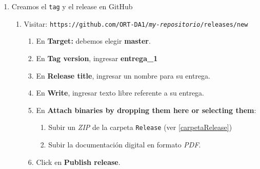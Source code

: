 \documentclass[12pt,a4paper]{article}
\begin{document}
\begin{enumerate}
	\item Creamos el \texttt{tag} y el release en GitHub
	\begin{enumerate}
		\item Visitar: \texttt{https://github.com/ORT-DA1/\textit{my-repositorio}/releases/new}
		\begin{enumerate}
			\item En \textbf{Target:} debemos elegir \textbf{master}.
			\item En \textbf{Tag version}, ingresar \textbf{entrega\_1}
			\item En \textbf{Release title}, ingresar un nombre para su entrega.
			\item En \textbf{Write}, ingresar texto libre referente a su entrega.
			\item En \textbf{Attach binaries by dropping them here or selecting them}:
			\begin{enumerate}
				\item Subir un \textit{ZIP} de la carpeta \texttt{Release} (ver \autoref{carpetaRelease})
				\item Subir la documentación digital en formato \textit{PDF}.
			\end{enumerate}		
			\item Click en \textbf{Publish release}.	
		\end{enumerate}
	\end{enumerate}
		\begin{figure}[H]		\centering {} 
\end{figure}
\end{enumerate}
\end{document}
